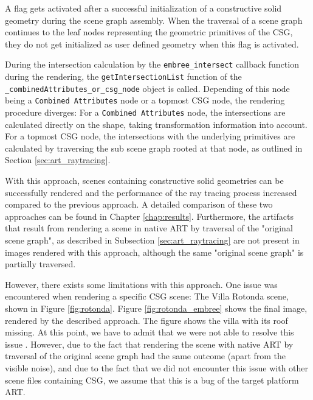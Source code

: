 A flag gets activated after a successful initialization of a constructive solid geometry during the scene graph assembly. When the traversal of a scene graph continues to the leaf nodes representing the geometric primitives of the CSG, they do not get initialized as user defined geometry when this flag is activated.

During the intersection calculation by the \texttt{embree\_intersect} callback function during the rendering, the \texttt{getIntersectionList} function of the \texttt{\_combinedAttributes\_or\_csg\_node} object is called. Depending of this node being a \texttt{Combined Attributes} node or a topmost CSG node, the rendering procedure diverges: For a \texttt{Combined Attributes} node, the intersections are calculated directly on the shape, taking transformation information into account. For a topmost CSG node, the intersections with the underlying primitives are calculated by traversing the sub scene graph rooted at that node, as outlined in Section \ref{sec:art_raytracing}. 

With this approach, scenes containing constructive solid geometries can be successfully rendered and the performance of the ray tracing process increased compared to the previous approach.  A detailed comparison of these two approaches can be found in Chapter \ref{chap:results}. Furthermore, the artifacts that result from rendering a scene in native ART by traversal of the "original scene graph", as described in Subsection \ref{sec:art_raytracing} are not present in images rendered with this approach, although the same "original scene graph" is partially traversed.

However, there exists some limitations with this approach. One issue was encountered when rendering a specific CSG scene: The Villa Rotonda scene, shown in Figure \ref{fig:rotonda}. Figure \ref{fig:rotonda_embree} shows the final image, rendered by the described approach. The figure shows the villa with its roof missing. At this point, we have to admit that we were not able to resolve this issue . However, due to the fact that rendering the scene with native ART by traversal of the original scene graph had the same outcome (apart from the visible noise), and due to the fact that we did not encounter this issue with other scene files containing CSG, we assume that this is a bug of the target platform ART. 








